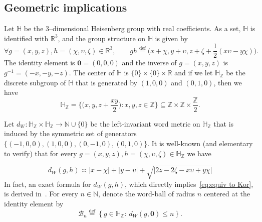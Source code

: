 \documentclass[11pt,reqno]{amsart}
\renewcommand{\H}{\mathbb{H}}
\newcommand{\N}{\mathbb{N}}
\newcommand{\R}{\mathbb{R}}
\newcommand{\Z}{\mathbb{Z}}
\newcommand{\Kor}{\mathsf{Kor}}
\newcommand{\0}{\mathbf{0}}
\renewcommand{\1}{\mathbf 1}
\newcommand{\from}{\colon}
\renewcommand{\mid}{:}
\renewcommand{\subset}{\subseteq}
\newcommand{\eqdef}{\stackrel{\mathrm{def}}{=}}
\renewcommand{\le}{\leqslant}
\theoremstyle{remark}
\begin{document}
\subsection{Geometric implications}  Let $\H$ be the $3$--dimensional Heisenberg group with real coefficients. As a set,  $\H$ is identified  with $\R^{3}$, and the group structure on $\H$ is  given by
\begin{equation}\label{eq:def Heisenberg product}
\forall g=(x,y,z),h=(\chi, \upsilon,\zeta)\in \R^3,\qquad g h\eqdef \Big(x+\chi,y+\upsilon,z+\zeta+\frac{1}{2}(x\upsilon- y\chi)\Big).
\end{equation}
The identity element is $\0=(0,0,0)$ and the inverse of $g=(x,y,z)$  is $g^{-1}=(-x,-y,-z)$. The center of $\H$ is $\{0\}\times \{0\}\times \R$ and if we let $\H_\Z$ be the discrete subgroup of $\H$ that is generated by $(1,0,0)$ and $(0,1,0)$, then we have
$$\H_\Z=\bigg\{\Big(x,y,z+\frac{xy}{2}\Big)\mid x,y,z\in \Z\bigg\}\subset \Z\times \Z\times \frac{\Z}{2}.$$

Let $d_W\from\H_\Z\times \H_\Z\to \N\cup\{0\}$ be the left-invariant word metric on $\H_\Z$ that is induced by the symmetric set of generators $\{(-1,0,0),(1,0,0),(0,-1,0),(0,1,0)\}$. It is well-known (and elementary to verify) that for every $g=(x,y,z),h=(\chi, \upsilon,\zeta)\in \H_\Z$ we have

\begin{equation}\label{eq:equiv to Kor}
 d_W(g,h)\asymp |x-\chi|+|y-\upsilon|+\sqrt{|2z-2\zeta-x\upsilon+y\chi|}
\end{equation}
In fact, an exact formula for $d_W(g,h)$, which directly implies~\eqref{eq:equiv to Kor}, is derived in~\cite{Bla03}. For every $n\in \N$, denote   the word-ball of radius $n$   centered at the identity element by
\begin{equation}\label{eq:word ball}
\mathcal{B}_n\eqdef \left\{g\in \H_\Z:\ d_W(g,\0)\le n\right\}.
\end{equation}
\end{document}
